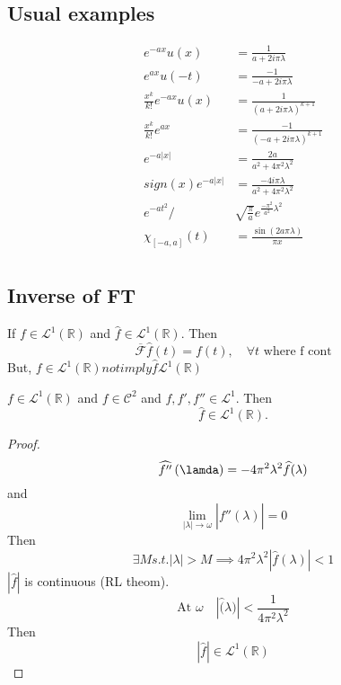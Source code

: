 \subsection{Usual examples}
\label{subsec:Usual examples}
\begin{align*}
    e^{ -ax} u(x) &= \frac{ 1 }{ a+2i\pi\lambda  }  \\ 
    e^{ ax} u(-t)  &= \frac{ -1 }{ -a + 2i\pi\lambda}  \\ 
    \frac{ x^k }{ k! } e^{ -ax} u(x)  &=  \frac{ 1 }{ \left( a + 2i\pi\lambda \right)
    ^{k+1}  } \\ 
        \frac{ x^k }{ k! } e^{ax} &= \frac{ -1 }{ \left(-a + 2i\pi\lambda\right)^{k+1}  }  \\ 
        e^{ -a \left | x \right | }  &= \frac{ 2a }{ a^2 + 4\pi^2\lambda^2 }  \\ 
        sign(x) e^{ -a \left | x \right | }  &= \frac{ -4i\pi\lambda }{ a^2 +
        4\pi^2\lambda^2 }  \\
            e^{-at^2} /& \sqrt{ \frac{ \pi }{ a } } e^{ \frac{ -\pi^2 }{ a^2 } \lambda^2}    \\
            \chi _{[-a, a]} (t)  &= \frac{ \sin(2a\pi\lambda)  }{ \pi x }  \\ 
\end{align*}

\subsection{Inverse of FT}
\label{subsec:Inverse of FT}
\begin{ftheo}[Inverse of FT]
    If $ f \in \mathscr{L}^1\left( \mathbb{R}\right)   $ and $ \widehat{f} \in
    \mathscr{L}^1\left( \mathbb{R}\right)   $. Then 
    \[
        \overline{ \mathscr{ F } } \widehat{f}(t) = f(t) , \quad \forall t \text{ where f
        cont} 
    \]
    But, $ f\in \mathscr{L}^1\left( \mathbb{R}\right) notimply \widehat{f} 
    \mathscr{L}^1\left( \mathbb{R}\right)   $ 
    \label{th:Inverse of FT}
\end{ftheo}

\begin{cor}[]
    $ f \in \mathscr{L}^1\left( \mathbb{R}\right)   $ and $ f \in \mathscr{ C } ^2  $ and
    $ f, f', f'' \in \mathscr{ L } ^1 $. Then 
    \[
        \widehat{f} \in \mathscr{L}^1\left( \mathbb{R}\right) .  
    \]
\end{cor}

\begin{proof}
    \[
        \widehat{f''}\left( \lamda \right) = -4\pi^2\lambda^2 \widehat{f}(\lambda) 
    \]
    and 
    \[
        \lim_{ \left | \lambda  \right | \to \omega } \left | \widehat{f''} \left( \lambda
        \right)  \right | = 0
    \] 
    Then 
    \[
    \exists M s.t. \left | \lambda  \right | > M \implies 4\pi^2\lambda^2 \left |
    \widehat{f} \left( \lambda \right)  \right | < 1
    \]
    $ \left | \widehat{f} \right | $ is continuous (RL theom). 
    \[
        \text{At } \omega \quad \left | \widehat(\lambda)  \right | < \frac{ 1 }{
        4\pi^2\lambda^2 } 
    \]
    Then 
    \[
        \left | \widehat{f}  \right | \in \mathscr{L}^1\left( \mathbb{R}\right)  
    \]
\end{proof}



